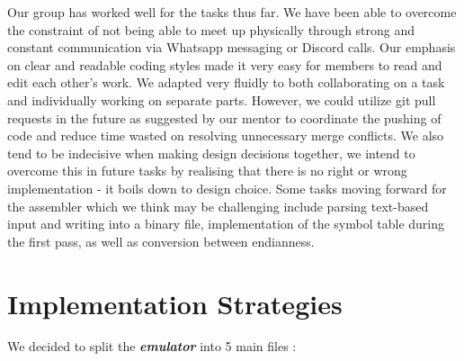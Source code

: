 \documentclass[11pt]{article}
\begin{document}
Our group has worked well for the tasks thus far. We have been able to overcome the constraint of not being able to meet up physically through strong and constant communication via Whatsapp messaging or Discord calls. Our emphasis on clear and readable coding styles made it very easy for members to read and edit each other’s work. We adapted very fluidly to both collaborating on a task and individually working on separate parts. However, we could utilize git pull requests in the future as suggested by our mentor to coordinate the pushing of code and reduce time wasted on resolving unnecessary merge conflicts. We also tend to be indecisive when making design decisions together, we intend to overcome this in future tasks by realising that there is no right or wrong implementation - it boils down to design choice. Some tasks moving forward for the assembler which we think may be challenging include parsing text-based input and writing into a binary file, implementation of the symbol table during the first pass, as well as conversion between endianness. \par


\section{Implementation Strategies}

We decided to split the \textbf{\emph{emulator}} into 5 main files :
\end{document}
